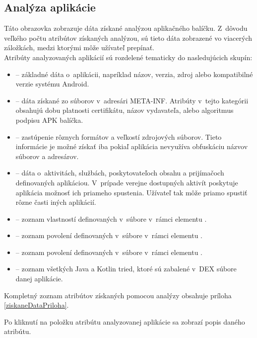 \subsection{Analýza aplikácie}
Táto obrazovka zobrazuje dáta získané analýzou aplikačného balíčku. Z~dôvodu veľkého počtu atribútov získaných analýzou, sú tieto dáta zobrazené vo viacerých záložkách, medzi ktorými môže užívateľ prepínať. 
\\
\noindent Atribúty analyzovaných aplikácií sú rozdelené tematicky do nasledujúcich skupín:
\begin{itemize}
	\item {} -- základné dáta o~aplikácii, napríklad názov, verzia, zdroj alebo kompatibilné verzie systému Android.
	\item {} -- dáta získané zo súborov v~adresári META-INF. Atribúty v~tejto kategórii obsahujú dobu platnosti certifikátu, názov vydavateľa, alebo algoritmus podpisu APK balíčka.
	\item {} -- zastúpenie rôznych formátov a veľkostí zdrojových súborov. Tieto informácie je možné získať iba pokiaľ aplikácia nevyužíva obfuskáciu názvov súborov a adresárov.
	\item {} -- dáta o~aktivitách, službách, poskytovateľoch obsahu a prijímačoch definovaných aplikáciou. V~prípade verejne dostupných aktivít poskytuje aplikácia možnosť ich priameho spustenia. Užívateľ tak môže priamo spustiť rôzne časti iných aplikácií.
	\item {} -- zoznam vlastností definovaných v~súbore  v~rámci elementu .
	\item {} -- zoznam povolení definovaných v~súbore  v~rámci elementu .
	\item {} -- zoznam povolení definovaných v~súbore  v~rámci elementu 
.
	\item {} -- zoznam všetkých Java a Kotlin tried, ktoré sú zabalené v~DEX súbore danej aplikácie.
\end{itemize}
Kompletný zoznam atribútov získaných pomocou analýzy obsahuje príloha \ref{ziskaneDataPriloha}. 

Po kliknutí na položku atribútu analyzovanej aplikácie sa zobrazí popis daného atribútu.

